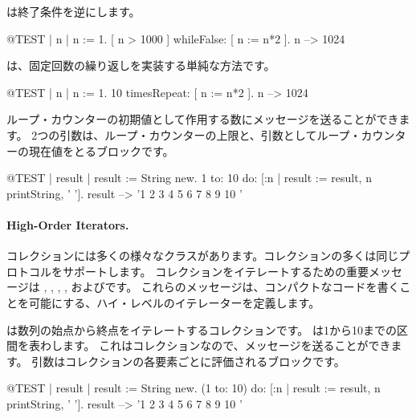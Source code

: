 \documentclass[a4paper,10pt,twoside]{book}
\begin{document}
\noindent
{}は終了条件を逆にします。
\begin{code}{@TEST | n |}
n := 1.
[ n > 1000 ] whileFalse: [ n := n*2 ].
n --> 1024
\end{code}

\noindent
{}は、固定回数の繰り返しを実装する単純な方法です。

\begin{code}{@TEST | n |}
n := 1.
10 timesRepeat: [ n := n*2 ].
n --> 1024
\end{code}

ループ・カウンターの初期値として作用する数にメッセージを送ることができます。
2つの引数は、ループ・カウンターの上限と、引数としてループ・カウンターの現在値をとるブロックです。

\begin{code}{@TEST | result |}
result := String new.
1 to: 10 do: [:n | result := result, n printString, ' '].
result --> '1 2 3 4 5 6 7 8 9 10 '
\end{code}


\paragraph{High-Order Iterators.}
コレクションには多くの様々なクラスがあります。コレクションの多くは同じプロトコルをサポートします。
コレクションをイテレートするための重要メッセージは
, , , , およびです。
これらのメッセージは、コンパクトなコードを書くことを可能にする、ハイ・レベルのイテレーターを定義します。

は数列の始点から終点をイテレートするコレクションです。
は1から10までの区間を表わします。
これはコレクションなので、メッセージを送ることができます。
引数はコレクションの各要素ごとに評価されるブロックです。

\begin{code}{@TEST | result |}
result := String new.
(1 to: 10) do: [:n | result := result, n printString, ' '].
result --> '1 2 3 4 5 6 7 8 9 10 '
\end{code}
\end{document}
